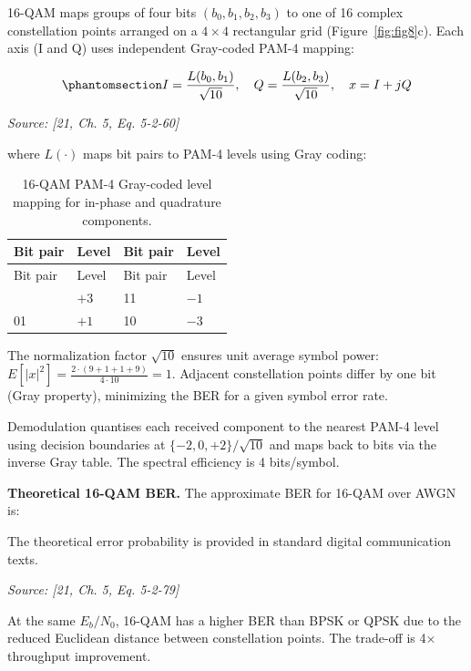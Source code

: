 16-QAM maps groups of four bits \((b_0, b_1, b_2, b_3)\) to one of 16 complex constellation points arranged on a \(4 \times 4\) rectangular grid (Figure~\ref{fig:fig8}c). Each axis (I and Q) uses independent Gray-coded PAM-4 mapping:

\begin{equation}\protect\phantomsection\label{eq:qam16-mapping}{I = \frac{L(b_0, b_1)}{\sqrt{10}}, \quad Q = \frac{L(b_2, b_3)}{\sqrt{10}}, \quad x = I + jQ
}\end{equation} \par{\small\textit{Source: [21, Ch. 5, Eq. 5-2-60]}}

where \(L(\cdot)\) maps bit pairs to PAM-4 levels using Gray coding:

\begin{longtable}[]{@{}llll@{}}
\caption{16-QAM PAM-4 Gray-coded level mapping for in-phase and quadrature components.}\label{tbl:table30}\tabularnewline
\toprule\noalign{}
Bit pair & Level & Bit pair & Level \\
\midrule\noalign{}
\endfirsthead
\toprule\noalign{}
Bit pair & Level & Bit pair & Level \\
\midrule\noalign{}
\endhead
\bottomrule\noalign{}
\endlastfoot
00 & \(+3\) & 11 & \(-1\) \\
01 & \(+1\) & 10 & \(-3\) \\
\end{longtable}

The normalization factor \(\sqrt{10}\) ensures unit average symbol power: \(E[|x|^2] = \frac{2 \cdot (9+1+1+9)}{4 \cdot 10} = 1\). Adjacent constellation points differ by one bit (Gray property), minimizing the BER for a given symbol error rate.

Demodulation quantises each received component to the nearest PAM-4 level using decision boundaries at \(\{-2, 0, +2\}/\sqrt{10}\) and maps back to bits via the inverse Gray table. The spectral efficiency is 4 bits/symbol.

\textbf{Theoretical 16-QAM BER.} The approximate BER for 16-QAM over AWGN is:

The theoretical error probability is provided in standard digital communication texts. \par{\small\textit{Source: [21, Ch. 5, Eq. 5-2-79]}}

At the same \(E_b/N_0\), 16-QAM has a higher BER than BPSK or QPSK due to the reduced Euclidean distance between constellation points. The trade-off is 4× throughput improvement.

